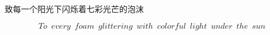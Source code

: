 \vspace*{\fill}
\begin{center}
    \Large 致每一个阳光下闪烁着七彩光芒的泡沫
\end{center}
\[To\enspace every\enspace foam\enspace glittering\enspace with\enspace colorful\enspace light\enspace under\enspace the\enspace sun\]
\vspace*{\fill}